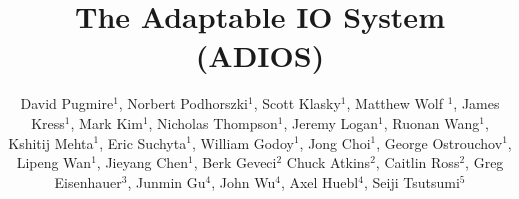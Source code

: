 \documentclass[x11names,table,xcdraw,graybox]{svmult}
\begin{document}
\title*{The Adaptable IO System (ADIOS)}
\label{chapter:ADIOS}


\author{
David Pugmire$^1$, 
Norbert Podhorszki$^1$,
Scott Klasky$^1$,
Matthew Wolf $^1$,
James Kress$^1$, 
Mark Kim$^1$,
Nicholas Thompson$^1$,
Jeremy Logan$^1$,
Ruonan Wang$^1$,
Kshitij Mehta$^1$,
Eric Suchyta$^1$,
William Godoy$^1$,
Jong Choi$^1$,
George Ostrouchov$^1$,
Lipeng Wan$^1$,
Jieyang Chen$^1$,
Berk Geveci$^2$
Chuck Atkins$^2$,
Caitlin Ross$^2$,
Greg Eisenhauer$^3$,
Junmin Gu$^4$,
John Wu$^4$,
Axel Huebl$^4$,
Seiji Tsutsumi$^5$
}



%
%
\maketitle

\abstract*{

}

\abstract{

}

%
%


%

%
%
%
%

%


\end{document}
